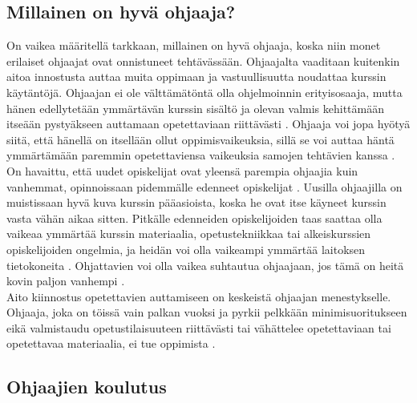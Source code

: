 \documentclass[finnish]{tktltiki2}
\theoremstyle{definition}
\theoremstyle{remark}
\begin{document}
\subsection{Millainen on hyvä ohjaaja?}
On vaikea määritellä tarkkaan, millainen on hyvä ohjaaja, koska niin monet erilaiset ohjaajat ovat onnistuneet tehtävässään. Ohjaajalta vaaditaan kuitenkin aitoa innostusta auttaa muita oppimaan ja vastuullisuutta noudattaa kurssin käytäntöjä. Ohjaajan ei ole välttämätöntä olla ohjelmoinnin erityisosaaja, mutta hänen edellytetään ymmärtävän kurssin sisältö ja olevan valmis kehittämään itseään pystyäkseen auttamaan opetettaviaan riittävästi \cite{Reges88}. Ohjaaja voi jopa hyötyä siitä, että hänellä on itsellään ollut oppimisvaikeuksia, sillä se voi auttaa häntä ymmärtämään paremmin opetettaviensa vaikeuksia samojen tehtävien kanssa \cite{Decker06}.
\\
On havaittu, että uudet opiskelijat ovat yleensä parempia ohjaajia kuin vanhemmat, opinnoissaan pidemmälle edenneet opiskelijat \cite{Dickson11}. Uusilla ohjaajilla on muistissaan hyvä kuva kurssin pääasioista, koska he ovat itse käyneet kurssin vasta vähän aikaa sitten. Pitkälle edenneiden opiskelijoiden taas saattaa olla vaikeaa ymmärtää kurssin materiaalia, opetustekniikkaa tai alkeiskurssien opiskelijoiden ongelmia, ja heidän voi olla vaikeampi ymmärtää laitoksen tietokoneita \cite{Reges88}. Ohjattavien voi olla vaikea suhtautua ohjaajaan, jos tämä on heitä kovin paljon vanhempi \cite{Decker06}.
\\
Aito kiinnostus opetettavien auttamiseen on keskeistä ohjaajan menestykselle. Ohjaaja, joka on töissä vain palkan vuoksi ja pyrkii pelkkään minimisuoritukseen eikä valmistaudu opetustilaisuuteen riittävästi tai vähättelee opetettaviaan tai opetettavaa materiaalia, ei tue oppimista \cite{Richards00}.


\subsection{Ohjaajien koulutus}
\end{document}
